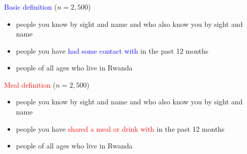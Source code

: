 \documentclass[aspectratio=169]{beamer}
\begin{document}
\begin{frame}
\frametitle{}

{\Large
\begin{center}
\textcolor{blue}{Basic definition} ($n=2,500$)
\end{center}
}
\begin{itemize}
\item people you know by sight and name and who also know you by sight and name  
\item people you have \textcolor{blue}{had some contact with} in the past 12 months
\item people of all ages who live in Rwanda
\end{itemize}

{\Large
\begin{center}
\textcolor{red}{Meal definition} ($n=2,500$)
\end{center}
}
\begin{itemize}
\item people you know by sight and name and who also know you by sight and name  
\item people you have \textcolor{red}{shared a meal or drink with} in the past 12 months
\item people of all ages who live in Rwanda
\end{itemize}

\end{frame}
\end{document}
